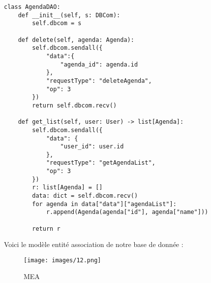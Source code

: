 \documentclass{article}
\begin{document}
\begin{lstlisting}
class AgendaDAO:
    def __init__(self, s: DBCom):
        self.dbcom = s

    def delete(self, agenda: Agenda):
        self.dbcom.sendall({
            "data":{
                "agenda_id": agenda.id
            },
            "requestType": "deleteAgenda",
            "op": 3
        })
        return self.dbcom.recv()
    
    def get_list(self, user: User) -> list[Agenda]:
        self.dbcom.sendall({
            "data": {
                "user_id": user.id
            },
            "requestType": "getAgendaList",
            "op": 3
        })
        r: list[Agenda] = []
        data: dict = self.dbcom.recv()
        for agenda in data["data"]["agendaList"]:
            r.append(Agenda(agenda["id"], agenda["name"]))

        return r
\end{lstlisting}

\newpage
\noindent Voici le modèle entité association de notre base de donnée :
\begin{figure}[H]
    \centering
    \texttt{[image: images/12.png]}
    \caption{MEA}
\end{figure}
\end{document}
